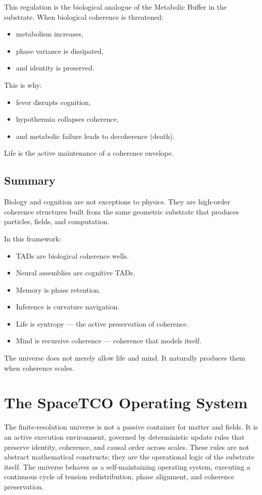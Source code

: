 \documentclass[reprint,amsmath,amssymb,aps,prl,floatfix]{revtex4-2}
\begin{document}
\begin{itemize}
This regulation is the biological analogue of the Metabolic Buffer in the substrate. When biological coherence is threatened:
\begin{itemize}
\item metabolism increases,  
\item phase variance is dissipated,  
\item and identity is preserved.
\end{itemize}

This is why:
\begin{itemize}
\item fever disrupts cognition,  
\item hypothermia collapses coherence,  
\item and metabolic failure leads to decoherence (death).
\end{itemize}
\medskip

Life is the active maintenance of a coherence envelope.

\subsection{Summary}

Biology and cognition are not exceptions to physics.  
They are high‑order coherence structures built from the same geometric substrate that produces particles, fields, and computation.
\medskip

In this framework:
\begin{itemize}
\item TADs are biological coherence wells.  
\item Neural assemblies are cognitive TADs.  
\item Memory is phase retention.  
\item Inference is curvature navigation.  
\item Life is syntropy — the active preservation of coherence.  
\item Mind is recursive coherence — coherence that models itself.
\end{itemize}
\medskip

The universe does not merely allow life and mind.  
It naturally produces them when coherence scales.

\section{The SpaceTCO Operating System}

The finite‑resolution universe is not a passive container for matter and fields. It is an active execution environment, governed by deterministic update rules that preserve identity, coherence, and causal order across scales. These rules are not abstract mathematical constructs; they are the operational logic of the substrate itself. The universe behaves as a self‑maintaining operating system, executing a continuous cycle of tension redistribution, phase alignment, and coherence preservation.
\medskip


\end{itemize}
\end{document}
